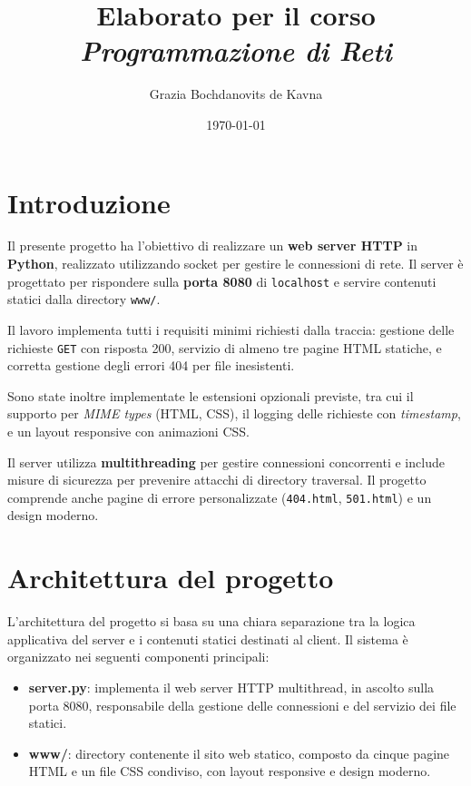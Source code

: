 \documentclass[a4paper,12pt]{report}
\title{Elaborato per il corso \\ \textit{Programmazione di Reti}}
\author{Grazia Bochdanovits de Kavna}
\date{\today}
\begin{document}
\maketitle

\tableofcontents

\chapter{Introduzione}

Il presente progetto ha l'obiettivo di realizzare un \textbf{web server HTTP} in \textbf{Python}, realizzato utilizzando socket per gestire le connessioni di rete. 
Il server è progettato per rispondere sulla \textbf{porta 8080} di \texttt{localhost} e servire contenuti statici dalla directory \texttt{www/}.

Il lavoro implementa tutti i requisiti minimi richiesti dalla traccia: gestione delle richieste \texttt{GET} con risposta 200, servizio di almeno tre pagine HTML statiche, e corretta gestione degli errori 404 per file inesistenti. 

Sono state inoltre implementate le estensioni opzionali previste, tra cui il supporto per \textit{MIME types} (HTML, CSS), il logging delle richieste con \textit{timestamp}, e un layout responsive con animazioni CSS.

Il server utilizza \textbf{multithreading} per gestire connessioni concorrenti e include misure di sicurezza per prevenire attacchi di directory traversal. 
Il progetto comprende anche pagine di errore personalizzate (\texttt{404.html}, \texttt{501.html}) e un design moderno.

\chapter{Architettura del progetto}

L'architettura del progetto si basa su una chiara separazione tra la logica applicativa del server e i contenuti statici destinati al client. 
Il sistema è organizzato nei seguenti componenti principali:

\begin{itemize}
    \item \textbf{server.py}: implementa il web server HTTP multithread, in ascolto sulla porta 8080, responsabile della gestione delle connessioni e del servizio dei file statici.
    \item \textbf{www/}: directory contenente il sito web statico, composto da cinque pagine HTML e un file CSS condiviso, con layout responsive e design moderno.
\end{itemize}
\end{document}
